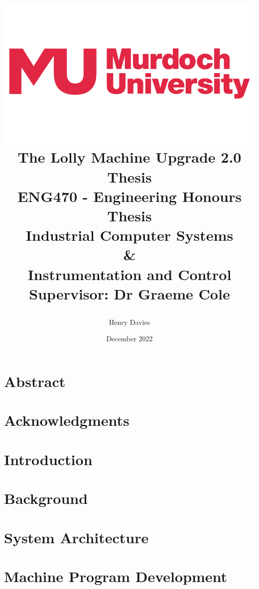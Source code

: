 \documentclass{book}
\title  {\begin{center}
            \includegraphics[scale = 0.2]{murdochLogo} 
            \vspace{10mm}
            \\{\Huge The Lolly Machine Upgrade 2.0}
            \vspace{10mm}
            \\{\Huge Thesis}
            \vspace{5mm}
            \\{\Large ENG470 - Engineering Honours Thesis}
            \vspace{9mm}
           \\{\Large Industrial Computer Systems}
            \\ \&
            \\{\Large Instrumentation and Control}
            \vspace{60mm}
            \\ Supervisor: Dr Graeme Cole
            
        \end{center}}
\author{Henry Davies}
\date{December 2022}
\begin{document}
\frontmatter

\maketitle
\newpage

\chapter*{Abstract}


\chapter*{Acknowledgments}



\tableofcontents
{}
\newpage

\listoffigures
{}
\newpage

\printglossary[type=\acronymtype]
\newpage

\mainmatter
\pagestyle{plain}

\chapter{Introduction}
    \label{chap:intro}
    
    \newpage

\chapter{Background}
    \label{chap:background}
    
    \newpage

\chapter{System Architecture}
    \label{chap:sysArch}
    
    \newpage
    
\chapter{Machine Program Development}
    \label{chap:plc}
    
    \newpage  
    
\end{document}
